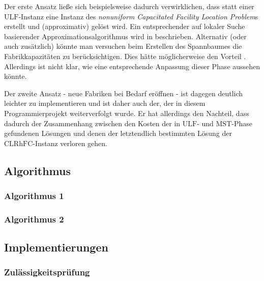 \documentclass[a4paper,ngerman,11pt,bibtotoc]{scrartcl}
\theoremstyle{definition}
\theoremstyle{plain}
\theoremstyle{remark}
\newcommand{\CLRHFC}{\mathrm{CLRhFC}}
\newcommand{\MST}{\mathrm{MST}}
\newcommand{\ULF}{\mathrm{ULF}}
\begin{document}
	Der erste Ansatz ließe sich beispielsweise dadurch verwirklichen, dass statt einer $\ULF$-Instanz eine Instanz des \emph{nonuniform Capacitated Facility Location Problem}s erstellt und (approximativ) gelöst wird. Ein entsprechender auf lokaler Suche basierender Approximationsalgorithmus wird in \cite{Pal01facilitylocation} beschrieben. Alternativ (oder auch zusätzlich) könnte man versuchen beim Erstellen des Spannbaumes die Fabrikkapazitäten zu berücksichtigen. Dies hätte möglicherweise den Vorteil . Allerdings ist nicht klar, wie eine entsprechende Anpassung dieser Phase aussehen könnte.
	
	Der zweite Ansatz - neue Fabriken bei Bedarf eröffnen - ist dagegen deutlich leichter zu implementieren und ist daher auch der, der in diesem Programmierprojekt weiterverfolgt wurde. Er hat allerdings den Nachteil, dass dadurch der Zusammenhang zwischen den Kosten der in $\ULF$- und $\MST$-Phase gefundenen Lösungen und denen der letztendlich bestimmten Lösung der $\CLRHFC$-Instanz verloren gehen. 

	\subsection{Algorithmus}
	

	\subsubsection{Algorithmus 1}
	
	\subsubsection{Algorithmus 2}
	

	\subsection{Implementierungen}
	
	\subsubsection{Zulässigkeitsprüfung}
	
\end{document}
